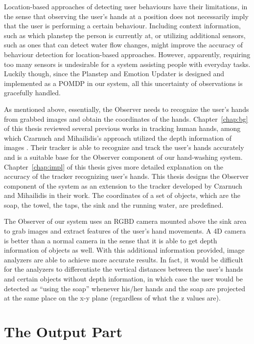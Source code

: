 Location-based approaches of detecting user behaviours have their limitations, in the sense that observing the user's hands at a position does not necessarily imply that the user is performing a certain behaviour. Including context information, such as which planstep the person is currently at, or utilizing additional sensors, such as ones that can detect water flow changes, might improve the accuracy of behaviour detection for location-based approaches. However, apparently, requiring too many sensors is undesirable for a system assisting people with everyday tasks. Luckily though, since the Planstep and Emotion Updater is designed and implemented as a POMDP in our system, all this uncertainty of observations is gracefully handled.

As mentioned above, essentially, the Observer needs to recognize the user's hands from grabbed images and obtain the coordinates of the hands. Chapter~\ref{chap:bg} of this thesis reviewed several previous works in tracking human hands, among which Czarnuch and Mihailidis's approach utilized the depth information of images \cite{czarnuch2014}. Their tracker is able to recognize and track the user's hands accurately and is a suitable base for the Observer component of our hand-washing system. Chapter~\ref{chap:impl} of this thesis gives more detailed explanation on the accuracy of the tracker recognizing user's hands. This thesis designs the Observer component of the system as an extension to the tracker developed by Czarnuch and Mihailidis in their work. The coordinates of a set of objects, which are the soap, the towel, the taps, the sink and the running water, are predefined. 

The Observer of our system uses an RGBD camera mounted above the sink area to grab images and extract features of the user's hand movements. A 4D camera is better than a normal camera in the sense that it is able to get depth information of objects as well. With this additional information provided, image analyzers are able to achieve more accurate results. In fact, it would be difficult for the analyzers to differentiate the vertical distances between the user's hands and certain objects without depth information, in which case the user would be detected as ``using the soap'' whenever his/her hands and the soap are projected at the same place on the x-y plane (regardless of what the z values are). 

\section{The Output Part}

